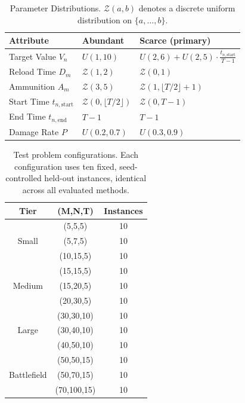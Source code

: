 
\begin{table}[htbp]
\centering
\small
\caption{Parameter Distributions. $\mathcal{Z}(a,b)$ denotes a discrete uniform distribution on $\{a,\ldots,b\}$.}
\label{tab:parameter_distributions}
\begin{tabular}{l|l|l}
\hline
\textbf{Attribute} & \textbf{Abundant} & \textbf{Scarce (primary)} \\ \hline
Target Value $V_n$ & $U(1, 10)$ & $U(2,6) + U(2,5)\cdot\frac{t_{n,\text{start}}}{T-1}$ \\
Reload Time $D_m$ & $\mathcal{Z}(1, 2)$ & $\mathcal{Z}(0, 1)$ \\
Ammunition $A_m$ & $\mathcal{Z}(3, 5)$ & $\mathcal{Z}(1, \lfloor T/2\rfloor{+}1)$ \\
Start Time $t_{n,\text{start}}$ & $\mathcal{Z}(0, \lfloor T/2\rfloor)$ & $\mathcal{Z}(0, T{-}1)$ \\
End Time $t_{n,\text{end}}$ & $T{-}1$ & $T{-}1$ \\
Damage Rate $P$ & $U(0.2, 0.7)$ & $U(0.3, 0.9)$ \\ \hline
\end{tabular}
\end{table}

\begin{table}[htbp]
\centering
\small
\caption{Test problem configurations. Each configuration uses ten fixed, seed-controlled held-out instances, identical across all evaluated methods.}
\label{tab:problem_instance_scales}
\begin{tabular}{c|c|c}
\hline
\textbf{Tier} & \textbf{(M,N,T)} & \textbf{Instances} \\ \hline
\multirow{3}{*}{Small}      & (5,5,5)    & 10 \\
                            & (5,7,5)    & 10 \\
                            & (10,15,5)  & 10 \\ \hline
\multirow{3}{*}{Medium}     & (15,15,5)  & 10 \\
                            & (15,20,5)  & 10 \\
                            & (20,30,5)  & 10 \\ \hline
\multirow{3}{*}{Large}      & (30,30,10) & 10 \\
                            & (30,40,10) & 10 \\
                            & (40,50,10) & 10 \\ \hline
\multirow{3}{*}{Battlefield} & (50,50,15) & 10 \\
                            & (50,70,15) & 10 \\
                            & (70,100,15) & 10 \\ \hline
\end{tabular}
\end{table}

